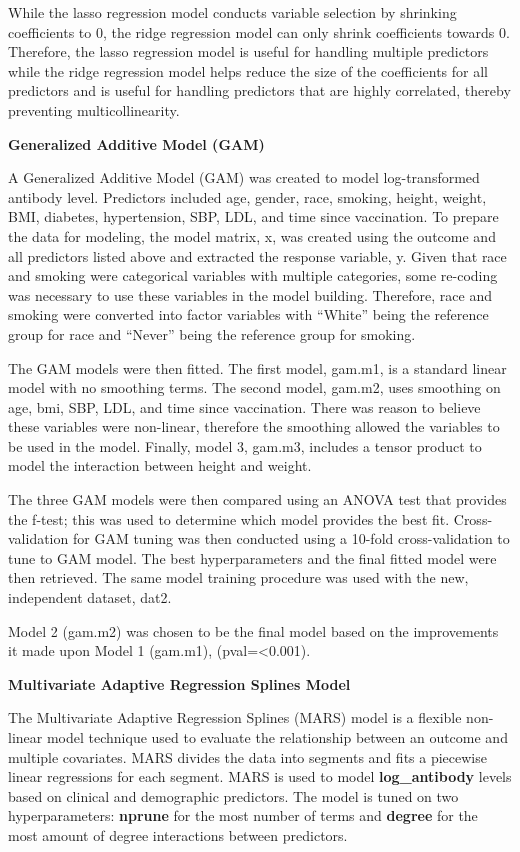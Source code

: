 \documentclass[
]{article}
\begin{document}
While the lasso regression model conducts variable selection by shrinking coefficients to 0, the ridge regression model can only shrink coefficients towards 0. Therefore, the lasso regression model is useful for handling multiple predictors while the ridge regression model helps reduce the size of the coefficients for all predictors and is useful for handling predictors that are highly correlated, thereby preventing multicollinearity.

\textbf{Generalized Additive Model (GAM)}

A Generalized Additive Model (GAM) was created to model log-transformed antibody level. Predictors included age, gender, race, smoking, height, weight, BMI, diabetes, hypertension, SBP, LDL, and time since vaccination. To prepare the data for modeling, the model matrix, x, was created using the outcome and all predictors listed above and extracted the response variable, y. Given that race and smoking were categorical variables with multiple categories, some re-coding was necessary to use these variables in the model building. Therefore, race and smoking were converted into factor variables with ``White'' being the reference group for race and ``Never'' being the reference group for smoking.

The GAM models were then fitted. The first model, gam.m1, is a standard linear model with no smoothing terms. The second model, gam.m2, uses smoothing on age, bmi, SBP, LDL, and time since vaccination. There was reason to believe these variables were non-linear, therefore the smoothing allowed the variables to be used in the model. Finally, model 3, gam.m3, includes a tensor product to model the interaction between height and weight.

The three GAM models were then compared using an ANOVA test that provides the f-test; this was used to determine which model provides the best fit. Cross-validation for GAM tuning was then conducted using a 10-fold cross-validation to tune to GAM model. The best hyperparameters and the final fitted model were then retrieved. The same model training procedure was used with the new, independent dataset, dat2.

Model 2 (gam.m2) was chosen to be the final model based on the improvements it made upon Model 1 (gam.m1), (pval=\textless0.001).

\textbf{Multivariate Adaptive Regression Splines Model}

The Multivariate Adaptive Regression Splines (MARS) model is a flexible non-linear model technique used to evaluate the relationship between an outcome and multiple covariates. MARS divides the data into segments and fits a piecewise linear regressions for each segment. MARS is used to model \textbf{log\_antibody} levels based on clinical and demographic predictors. The model is tuned on two hyperparameters: \textbf{nprune} for the most number of terms and \textbf{degree} for the most amount of degree interactions between predictors.
\end{document}
